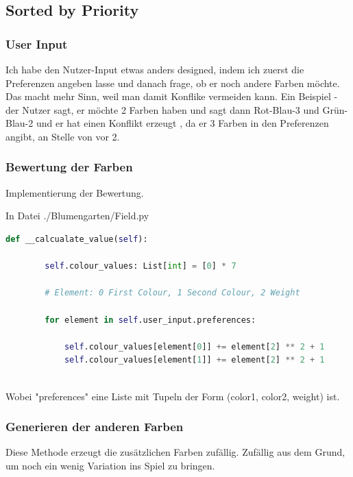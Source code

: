 \documentclass{article}
\begin{document}
\newpage

\subsection{Sorted by Priority}

\subsubsection{ User Input }

Ich habe den Nutzer-Input etwas anders designed, indem ich zuerst die Preferenzen angeben lasse und danach frage, ob er noch andere Farben möchte. Das macht mehr Sinn, weil man damit Konflike vermeiden kann. Ein Beispiel - der Nutzer sagt, er möchte 2 Farben haben und sagt dann Rot-Blau-3 und Grün-Blau-2 und er hat einen Konflikt erzeugt , da er 3 Farben in den Preferenzen angibt, an Stelle von vor 2.


\subsubsection{Bewertung der Farben}

Implementierung der Bewertung. \newline

In Datei ./Blumengarten/Field.py
\begin{lstlisting}[language=Python]
    def __calcualate_value(self):

        self.colour_values: List[int] = [0] * 7

        # Element: 0 First Colour, 1 Second Colour, 2 Weight

        for element in self.user_input.preferences:

            self.colour_values[element[0]] += element[2] ** 2 + 1
            self.colour_values[element[1]] += element[2] ** 2 + 1	
	
\end{lstlisting}

Wobei "preferences"  eine Liste mit Tupeln der Form (color1, color2, weight) ist.

\subsubsection{Generieren der anderen Farben}

Diese Methode erzeugt die zusätzlichen Farben zufällig. Zufällig aus dem Grund, um noch ein wenig Variation ins Spiel zu bringen.
\end{document}
